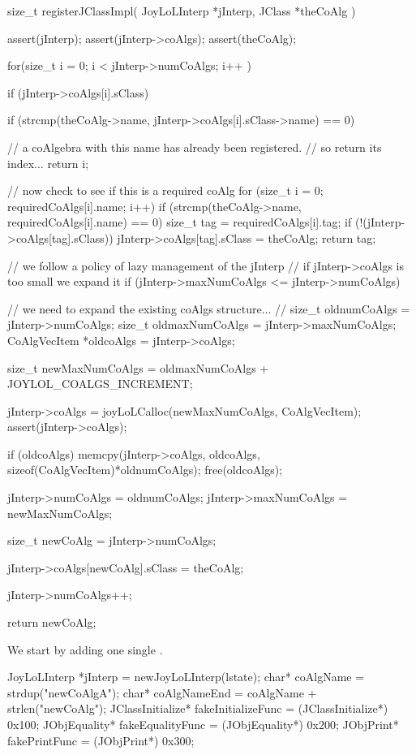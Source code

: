 \startCCode
size_t registerJClassImpl(
  JoyLoLInterp *jInterp,
  JClass *theCoAlg
) {
  assert(jInterp);
  assert(jInterp->coAlgs);
  assert(theCoAlg);
  
  for(size_t i = 0; i < jInterp->numCoAlgs; i++ ) {
    if (jInterp->coAlgs[i].sClass) {
      if (strcmp(theCoAlg->name,
        jInterp->coAlgs[i].sClass->name) == 0) {
    
        // a coAlgebra with this name has already been registered. 
        // so return its index...
        return i;
      }
    }
  }

  // now check to see if this is a required coAlg
  for (size_t i = 0; requiredCoAlgs[i].name; i++) {
    if (strcmp(theCoAlg->name, requiredCoAlgs[i].name) == 0) {
      size_t tag = requiredCoAlgs[i].tag;
      if (!(jInterp->coAlgs[tag].sClass)) {
        jInterp->coAlgs[tag].sClass = theCoAlg;
      }
      return tag;
    }
  }

  // we follow a policy of lazy management of the jInterp
  // if jInterp->coAlgs is too small we expand it
  if (jInterp->maxNumCoAlgs <= jInterp->numCoAlgs) {
    // we need to expand the existing coAlgs structure...
    //  
    size_t oldnumCoAlgs     = jInterp->numCoAlgs;
    size_t oldmaxNumCoAlgs  = jInterp->maxNumCoAlgs;
    CoAlgVecItem *oldcoAlgs = jInterp->coAlgs;
    
    size_t newMaxNumCoAlgs =
      oldmaxNumCoAlgs + JOYLOL_COALGS_INCREMENT;

    jInterp->coAlgs =
      joyLoLCalloc(newMaxNumCoAlgs, CoAlgVecItem);
    assert(jInterp->coAlgs);
    
    if (oldcoAlgs) {
      memcpy(jInterp->coAlgs,
        oldcoAlgs,
        sizeof(CoAlgVecItem)*oldnumCoAlgs);
      free(oldcoAlgs);
    }
    
    jInterp->numCoAlgs    = oldnumCoAlgs;
    jInterp->maxNumCoAlgs = newMaxNumCoAlgs;
  }
  
  size_t newCoAlg = jInterp->numCoAlgs;
  
  jInterp->coAlgs[newCoAlg].sClass      = theCoAlg;
  
  jInterp->numCoAlgs++;
  
  return newCoAlg;
}
\stopCCode


We start by adding one single . 

\startCTest
  JoyLoLInterp *jInterp = newJoyLoLInterp(lstate);
  char*             coAlgName          = strdup("newCoAlgA");
  char*             coAlgNameEnd       = coAlgName + strlen("newCoAlg");
  JClassInitialize* fakeInitializeFunc = (JClassInitialize*) 0x100;
  JObjEquality*    fakeEqualityFunc    = (JObjEquality*)   0x200;
  JObjPrint*       fakePrintFunc       = (JObjPrint*)      0x300;
  
